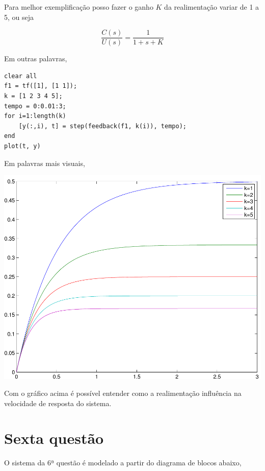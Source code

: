 \documentclass[paper=a4, fontsize=11pt]{article}
\begin{document}
Para melhor exemplificação posso fazer o ganho $K$ da realimentação variar de 1 a 5, ou seja

\begin{equation}
    \frac{C(s)}{U(s)} = \frac{1}{1+s+K}
\end{equation}

Em outras palavras,

\begin{lstlisting}
clear all
f1 = tf([1], [1 1]);
k = [1 2 3 4 5];
tempo = 0:0.01:3;
for i=1:length(k)
    [y(:,i), t] = step(feedback(f1, k(i)), tempo);
end
plot(t, y)
\end{lstlisting}

Em palavras mais visuais,

\begin{center}
    \includegraphics[scale=0.5]{q5ibvr.pdf}
\end{center}

Com o gráfico acima é possível entender como a realimentação influência na
velocidade de resposta do sistema.


\section{Sexta questão}

O sistema da 6ª questão é modelado a partir do diagrama de blocos abaixo,
\end{document}
